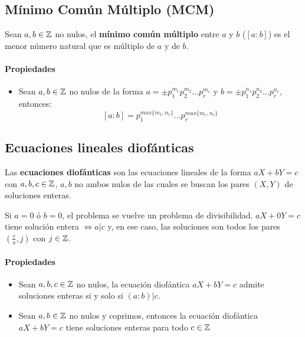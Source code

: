 \subsection{Mínimo Común Múltiplo (MCM)}
Sean $a,b\in\mathbb{Z}$ no nulos, el \textbf{mínimo común múltiplo} entre $a$ y $b$ ($[a:b]$) es el menor número natural que es múltiplo de $a$ y de $b$. 

\paragraph{Propiedades}
\begin{itemize}
\item Sean $a,b\in\mathbb{Z}$ no nulos de la forma $a=\pm p_1^{m_1}p_2^{m_2}\dots p_r^{m_r}$ y $b=\pm p_1^{n_1}p_2^{n_2}\dots p_r^{n_r}$, entonces: $$[a:b] =  p_1^{max\{m_1,n_1\}}\dots p_r^{max\{m_r,n_r\}}$$
\end{itemize}

\subsection{Ecuaciones lineales diofánticas}
Las \textbf{ecuaciones diofánticas} son las ecuaciones lineales de la forma $aX + bY = c$ con $a,b,c\in\mathbb{Z}$, $a,b$ no ambos nulos de las cuales se buscan los pares $(X,Y)$ de soluciones enteras.

Si $a = 0$ ó $b=0$, el problema se vuelve un problema de divisibilidad. $aX + 0Y = c$ tiene solución entera $\iff a|c$ y, en ese caso, las soluciones son todos los pares $(\frac{c}{a}, j)$ con $j\in\mathbb{Z}$.

\paragraph{Propiedades}
\begin{itemize}
\item Sean $a,b,c\in\mathbb{Z}$ no nulos, la ecuación diofántica $aX + bY = c$ admite soluciones enteras si y solo si $(a:b)|c$.
\item Sean $a,b\in\mathbb{Z}$ no nulos y coprimos, entonces la ecuación diofántica $aX+bY=c$ tiene soluciones enteras para todo $c\in\mathbb{Z}$
\end{itemize}

